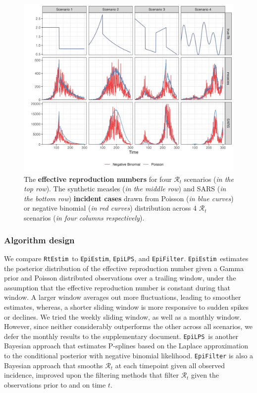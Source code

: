 \documentclass[10pt,letterpaper]{article}
\def\RtEstim{\texttt{RtEstim}}
\def\EpiEstim{\texttt{EpiEstim}}
\def\EpiLPS{\texttt{EpiLPS}}
\def\EpiFilter{\texttt{EpiFilter}}
\def\calR{\mathcal{R}}
\begin{document}
\begin{figure}[!ht]
  \centering
  \includegraphics[width=1.0\textwidth]{fig/fig_samples.png}
  \caption{The \textbf{effective reproduction numbers} for four $\calR_t$ scenarios (\textit{in the top row}). 
  The synthetic measles (\textit{in the middle row}) and SARS (\textit{in the bottom row}) \textbf{incident cases} drawn 
  from Poisson (\textit{in blue curves}) or negative binomial (\textit{in red curves}) distribution 
  across 4 $\calR_t$ scenarios (\textit{in four columns respectively}).} 
  \label{fig:samples}
\end{figure}

\subsubsection{Algorithm design}

We compare \RtEstim\ to \EpiEstim, \EpiLPS, and \EpiFilter. \EpiEstim\ estimates
the posterior distribution of the effective reproduction number given a Gamma
prior and Poisson distributed observations
over a trailing window, under the assumption that the effective reproduction number is
constant during that window. A larger window averages out more fluctuations,
leading to smoother estimates, whereas, a shorter sliding window is more
responsive to sudden spikes or declines. We tried the weekly sliding
window, as well as a monthly window. However, since neither considerably
outperforms the other across all scenarios, we defer the monthly results to the
supplementary document. \EpiLPS\ is another Bayesian approach that estimates P-splines 
based on the Laplace approximation to the conditional posterior with negative
binomial likelihood. \texttt{EpiFilter} is also a Bayesian approach that smooths 
$\calR_t$ at each timepoint given all observed incidence, improved upon the filtering methods
that filter $\calR_t$ given the observations prior to and on time $t$.
\end{document}
